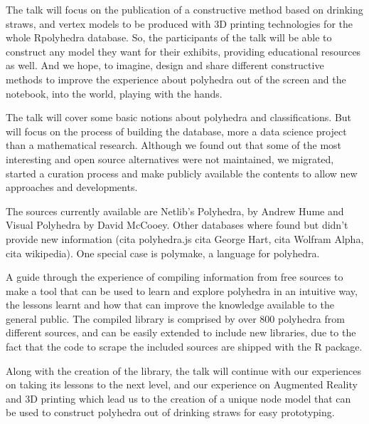 \documentclass[a4paper,10pt]{article}
\begin{document}
The talk will focus on the publication of a constructive method based on drinking straws, and vertex models to be produced with 3D printing technologies for the whole Rpolyhedra database. So, the participants of the talk will be able to construct any model they want for their exhibits, providing educational resources as well. And we hope, to imagine, design and share different constructive methods to improve the experience about polyhedra out of the screen and the notebook, into the world, playing with the hands.

The talk will cover some basic notions about polyhedra and classifications. But will focus on the process of building the database, more a data science project than a mathematical research. Although we found out that some of the most interesting and open source alternatives were not maintained, we migrated, started a curation process and make publicly available the contents to allow new approaches and developments.

The sources currently available are Netlib's Polyhedra\cite{NETLIB}, by Andrew Hume and Visual Polyhedra\cite{DMCCOOEY} by David McCooey. Other databases where found but didn't provide new information (cita polyhedra.js cita George Hart, cita Wolfram Alpha, cita wikipedia). One special case is polymake, a language for polyhedra.

A guide through the experience of compiling information from free sources to make a tool that can be used to learn and explore polyhedra in an intuitive way, the lessons learnt and how that can improve the knowledge available to the general public. The compiled library is comprised by over 800 polyhedra from different sources, and can be easily extended to include new libraries, due to the fact that the code to scrape the included sources are shipped with the R package. 

Along with the creation of the library, the talk will continue with our experiences on taking its lessons to the next level, and our experience on Augmented Reality and 3D printing which lead us to the creation of a unique node model that can be used to construct polyhedra out of drinking straws for easy prototyping.  



\end{document}
